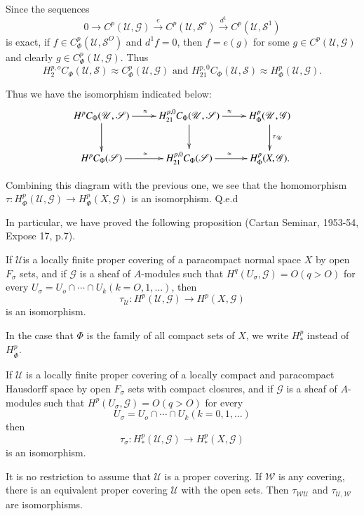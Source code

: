 Since the sequences
$$
0 \to C^p(\mathscr{U},\mathscr{G}) \overset{e}\to
C^p(\mathscr{U},\mathscr{S}^o) \overset{d^1}\to C^p
(\mathscr{U},\mathscr{S}^1)
$$ 
is exact, if $f \in C^p_\Phi
(\mathscr{U},\mathscr{S}^O)$ and $d^1 f=0$, then $f=e(g)$ for some $g
\in C^p (\mathscr{U},\mathscr{G})$ and clearly $g \in C^p_\Phi
(\mathscr{U},\mathscr{G})$. Thus  
$$
H^{p,o}_2 C_\Phi (\mathscr{U},\mathscr{S})\approx C^p_\Phi
(\mathscr{U},\mathscr{G}) \text{ and  } H^{p,0}_{21}C_\Phi
(\mathscr{U},\mathscr{S}) \approx H^p_\Phi (\mathscr{U},\mathscr{G}).
$$  

Thus we have the isomorphism indicated below: 
\[
\xymatrix{
H^pC_{\Phi} (\mathscr{U},\mathscr{S}) \ar[r]^{\approx}\ar[d] &
H^{p,0}_{21} C_{\Phi}(\mathscr{U},\mathscr{S}) \ar[d] \ar[r]^{\approx}
& H^p_{\Phi} (\mathscr{U},\mathscr{G}) \ar[d]^{\tau_{\mathscr{U}}}\\
H^pC_{\Phi} (\mathscr{S}) \ar[r]^{\approx} & H^{p,0}_{21} C_{\Phi}
(\mathscr{S}) \ar[r]^{\approx} & H^p_{\Phi} (X,\mathscr{G}).
}
\]

Combining this diagram with the previous one, we see that the
homomorphism $\tau:{H^p_\Phi}(\mathscr{U},\mathscr{G}) \to H^p_ \Phi
(X, \mathscr{G})$ is an isomorphism. 
\hfill {Q.e.d}

In particular, we have proved the following proposition (Cartan
Seminar, 1953-54, Expose 17, p.7). 

\begin{proposition}%
If $\mathscr{U}$\pageoriginale is a locally finite proper covering of a
  paracompact normal space $X$ by open $F_\sigma$ sets, and if
  $\mathscr{G}$ is a sheaf of $A$-modules such that $H^q(U_
  \sigma,\mathscr{G})=O (q>O)$ for every $U_\sigma =U_o \cap \cdots
  \cap U_k (k=O,1, \ldots)$, then 
$$
\tau _\mathscr{U}:H^p(\mathscr{U},\mathscr{G}) \to H^p (X,\mathscr{G})
$$
is an isomorphism.
\end{proposition}

In the case that $\Phi$ is the family of all compact sets of $X$, we
write $H^p_*$ instead of $H^p_{\bar{\Phi}}$. 

\setcounter{proposition}{19}
\begin{proposition}[-a]%
If $\mathscr{U}$ is a locally finite proper covering of a locally
  compact and paracompact Hausdorff space by open $F_\sigma$ sets
  with compact closures, and if $\mathscr{G}$ is a sheaf of
  $A$-modules such that $H^p(U_\sigma, \mathscr{G})=O(q>O)$ for
 every 
$$
U_ \sigma=U_o \cap \cdots \cap U_k (k=0,1,\ldots) 
$$
then
$$
\tau _ \sigma:H^p_* (\mathscr{U},\mathscr{G})\to H^p_*(X,\mathscr{G}) 
$$
is an isomorphism.
\end{proposition}

\begin{note*}
It is no restriction to assume that $\mathscr{U}$ is a proper
covering. If $\mathscr{W}$ is any covering, there is an equivalent
proper covering $\mathscr{U}$ with the open sets. Then
$\tau_{\mathscr{W}\mathscr{U}}$ and $\tau _{\mathscr{U},\mathscr{W}}$
are isomorphisms. 
\end{note*}

